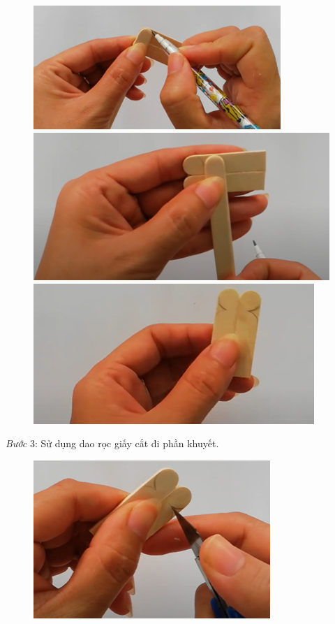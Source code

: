 \begin{multicols}{2}
\begin{figure}[H]
		\vspace*{1pt}
		\includegraphics[width=0.7\linewidth]{15}
		
		\vspace*{1pt}
		\includegraphics[width=0.7\linewidth]{16}
		
		\vspace*{1pt}
		\hspace*{1pt}\includegraphics[width=0.7\linewidth]{17}
		\vspace*{-5pt}
	\end{figure}
	\textit{Bước} $3$: Sử dụng dao rọc giấy cắt đi phần khuyết.
	\begin{figure}[H]
		\vspace*{-5pt}
		\centering
		\captionsetup{labelformat= empty, justification=centering}
		\includegraphics[width=0.7\linewidth]{18}
		

\end{figure}
\end{multicols}

